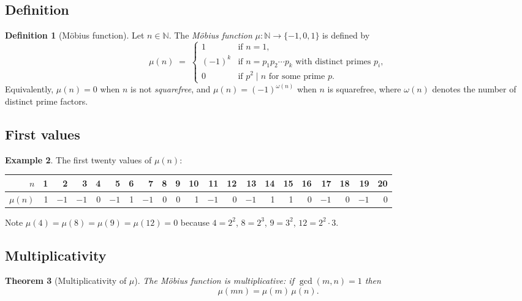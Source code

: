 \documentclass[12pt,a4paper]{amsart}
\newtheorem{theorem}{Theorem}[section]
\theoremstyle{definition}
\newtheorem{definition}[theorem]{Definition}
\newtheorem{example}[theorem]{Example}
\newcommand{\N}{\mathbb{N}}
\begin{document}
\subsection{Definition}

\begin{definition}[Möbius function]
\label{def:mobius}
Let $n \in \N$.  The \emph{Möbius function} $\mu : \N \to \{-1,0,1\}$ is
defined by
\[
  \mu(n) \;=\;
  \begin{cases}
    1                  & \text{if } n = 1, \\
    (-1)^{k}           & \text{if } n = p_1 p_2 \cdots p_k
                         \text{ with distinct primes } p_i, \\
    0                  & \text{if } p^2 \mid n \text{ for some prime } p.
  \end{cases}
\]
Equivalently, $\mu(n) = 0$ when $n$ is not \emph{squarefree}, and
$\mu(n) = (-1)^{\omega(n)}$ when $n$ is squarefree, where $\omega(n)$ denotes
the number of distinct prime factors.
\end{definition}

\subsection{First values}

\begin{example}
\label{ex:mobius-values}
The first twenty values of $\mu(n)$:
\begin{center}
\begin{tabular}{r|rrrrrrrrrrrrrrrrrrrr}
$n$      & 1 & 2 & 3 & 4 & 5 & 6 & 7 & 8 & 9 & 10
         & 11 & 12 & 13 & 14 & 15 & 16 & 17 & 18 & 19 & 20 \\
\hline
$\mu(n)$ & 1 & $-1$ & $-1$ & 0 & $-1$ & 1 & $-1$ & 0 & 0 & 1
         & $-1$ & 0 & $-1$ & 1 & 1 & 0 & $-1$ & 0 & $-1$ & 0
\end{tabular}
\end{center}
Note $\mu(4)=\mu(8)=\mu(9)=\mu(12)=0$ because $4=2^2$, $8=2^3$,
$9=3^2$, $12=2^2\cdot 3$.
\end{example}

\subsection{Multiplicativity}

\begin{theorem}[Multiplicativity of $\mu$]
\label{thm:mobius-mult}
The Möbius function is \emph{multiplicative}: if $\gcd(m,n)=1$ then
\[
  \mu(mn) = \mu(m)\,\mu(n).
\]
\end{theorem}
\end{document}
